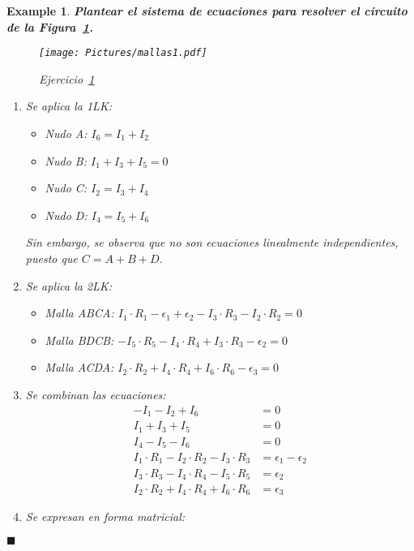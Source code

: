 \documentclass[11pt]{book} %
\numberwithin{dummy}{section}
\theoremstyle{ocrenumbox}
\theoremstyle{blacknumex}
\newtheorem{exampleT}{Example}[chapter]
\theoremstyle{blacknumbox}
\theoremstyle{ocrenum}
\newenvironment{example}{\begin{exampleT}}{\hfill{\tiny\ensuremath{\blacksquare}}\end{exampleT}}
\begin{document}
	\vspace{4mm}
	\begin{example}
		\label{ej.1-4}
		\textbf{Plantear el sistema de ecuaciones para resolver el circuito de la Figura~\ref{fig.mallas1}.}
		\begin{figure}[htbp]
			\centering
			\texttt{[image: Pictures/mallas1.pdf]}
			\caption{Ejercicio~\ref{ej.1-4}}
			\label{fig.mallas1}
		\end{figure}
		
		\begin{enumerate}
			\item {Se aplica la 1LK:} 
			\begin{itemize}
				\item {Nudo A:} $I_6 = I_1 + I_2$
				\item {Nudo B:} $I_1 + I_3 + I_5 = 0$
				\item {Nudo C:} $I_2 = I_3 + I_4$
				\item {Nudo D:} $I_4 = I_5 + I_6$
			\end{itemize}
			Sin embargo, se observa que no son ecuaciones linealmente independientes, puesto que $C=A+B+D$.
			\item {Se aplica la 2LK:}
			\begin{itemize}
				\item {Malla ABCA:} $I_1 \cdot R_1 - \epsilon_1 + \epsilon_2 - I_3 \cdot R_3 - I_2 \cdot R_2 = 0$
				\item {Malla BDCB:} $-I_5 \cdot R_5 - I_4 \cdot R_4 + I_3 \cdot R_3 - \epsilon_2 = 0$
				\item {Malla ACDA:} $I_2 \cdot R_2 + I_4 \cdot R_4 + I_6 \cdot R_6 - \epsilon_3 = 0$
			\end{itemize}
			\item {Se combinan las ecuaciones:}
			\begin{align*}
				- I_1 -  I_2 + I_6  &= 0\\
				I_1 + I_3 + I_5 &= 0\\
				I_4 - I_5 - I_6 &= 0\\
				I_1 \cdot R_1 - I_2 \cdot R_2 - I_3 \cdot R_3 &= \epsilon_1 - \epsilon_2\\
				I_3 \cdot R_3 - I_4 \cdot R_4 -I_5 \cdot R_5 &= \epsilon_2\\
				I_2 \cdot R_2 + I_4 \cdot R_4 + I_6 \cdot R_6 &= \epsilon_3
			\end{align*}
			\item {Se expresan en forma matricial:}
			\begin{equation*}

\end{equation*}
\end{enumerate}
\end{example}
\end{document}
